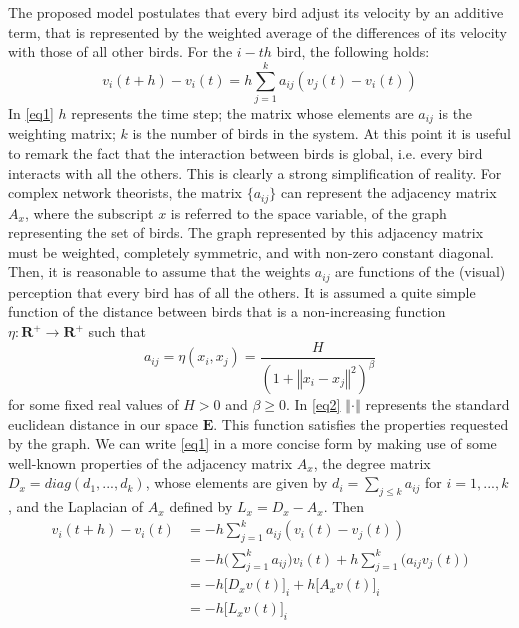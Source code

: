 \documentclass{article} %
\newcounter{other}
\newcounter{math}
\newcounter{late}
\begin{document}
The proposed model postulates that every bird adjust its velocity by an additive term,
that is represented by the weighted average of the differences of its velocity with
those of all other birds. For the $i-th$ bird, the following holds:
\begin{equation}
	\label{eq1}
	v_i(t+h)-v_i(t)=h\sum_{j=1}^k a_{ij}(v_j(t)-v_i(t))
\end{equation}
In \eqref{eq1} $h$ represents the time step; the matrix whose elements are $a_{ij}$  is 
the weighting matrix; $k$ is the number of birds in the system. At this point it is 
useful to remark the fact that the interaction between birds is global, i.e. every bird
interacts with all the others. This is clearly a strong simplification of reality.
For complex network theorists, the matrix $\lbrace a_{ij}\rbrace$ can represent the adjacency
matrix $A_x$, where the subscript $x$ is referred to the space variable, of the graph
representing the set of birds. The graph represented by this adjacency matrix must be 
weighted, completely symmetric, and with non-zero constant diagonal.
Then, it is reasonable to assume that the weights $a_{ij}$ are functions of the (visual) 
perception that every bird has of all the others. It is assumed a quite simple function 
of the distance between birds that is a non-increasing function 
$\eta:\mathbf{R}^+\rightarrow\mathbf{R}^+$ such that
\begin{equation}
	\label{eq2}
	a_{ij}=\eta(x_i,x_j)=\frac{H}{(1+\left\Vert x_i - x_j \right\Vert^2)^{\beta}}
\end{equation}
for some fixed real values of $H>0$ and $\beta\geq0$. In \eqref{eq2} 
$\left\Vert \cdot \right\Vert$ represents the standard euclidean distance in our space 
$\mathbf{E}$. This function satisfies the properties requested by the graph.
We can write \eqref{eq1} in a more concise form by making use of some well-known 
properties of the adjacency matrix $A_x$, the degree matrix $D_x=diag(d_1,...,d_k)$, whose
elements are given by $d_i=\sum_{j\leq k}a_{ij}$ for $i=1,...,k$, 
and the Laplacian of $A_x$ defined by $L_x=D_x-A_x$. Then
\begin{align}
\label{eq3}
    v_i(t+h)-v_i(t)& = -h\sum_{j=1}^k a_{ij}(v_i(t)-v_j(t))\\
    & = -h\bigg(\sum_{j=1}^k a_{ij}\bigg)v_i(t)+h\sum_{j=1}^k \big(a_{ij}v_j(t)\big)\nonumber\\
    & = -h\lbrack D_xv(t)\rbrack_i+h\lbrack A_xv(t)\rbrack_i\nonumber\\
    & = -h\lbrack L_xv(t)\rbrack_i\nonumber
\end{align}
\end{document}

